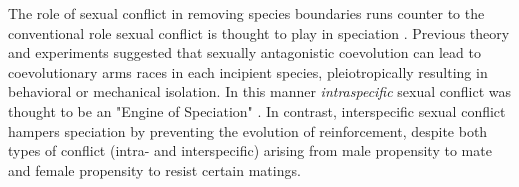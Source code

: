 \documentclass[11pt]{article}
\begin{document}

The role of sexual conflict in removing species boundaries runs counter to the conventional role sexual conflict is thought to play in speciation  \citep{parker1998, gavrilets2002, rice2005}. 
Previous theory \citep{gavrilets2002} and experiments \citep{rice1996} suggested that sexually antagonistic coevolution can lead to coevolutionary arms races in each incipient species, pleiotropically resulting in behavioral or mechanical isolation. 
In this manner \emph{intraspecific} sexual conflict was thought to be an "Engine of Speciation" \citep[e.g. ][]{rice2005}.  
In contrast, interspecific sexual conflict hampers speciation by preventing the evolution of reinforcement, despite both types of conflict (intra- and interspecific) arising from male propensity to mate and female propensity to resist certain matings. 
\end{document}
